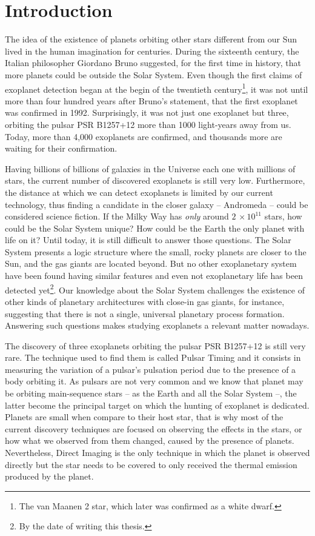 \chapter{Introduction}\label{chap:intro}
The idea of the existence of planets orbiting other stars different from our Sun lived in the human imagination for centuries. During the sixteenth century, the Italian philosopher Giordano Bruno suggested, for the first time in history, that more planets could be outside the Solar System. Even though the first claims of exoplanet detection began at the begin of the twentieth century\footnote{The van Maanen 2 star, which later was confirmed as a white dwarf.}, it was not until more than four hundred years after Bruno's statement, that the first exoplanet was confirmed in 1992. Surprisingly, it was not just one exoplanet but three, orbiting the pulsar PSR B1257+12 more than 1000 light-years away from us. Today, more than 4,000 exoplanets are confirmed, and thousands more are waiting for their confirmation.

Having billions of billions of galaxies in the Universe each one with millions of stars, the current number of discovered exoplanets is still very low. Furthermore, the distance at which we can detect exoplanets is limited by our current technology, thus finding a candidate in the closer galaxy -- Andromeda -- could be considered science fiction. If the Milky Way has \textit{only} around $2\,\times10^{11}$ stars, how could be the Solar System unique? How could be the Earth the only planet with life on it? Until today, it is still difficult to answer those questions. The Solar System presents a logic structure where the small, rocky planets are closer to the Sun, and the gas giants are located beyond. But no other exoplanetary system have been found having similar features and even not exoplanetary life has been detected yet\footnote{By the date of writing this thesis.}. Our knowledge about the Solar System challenges the existence of other kinds of planetary architectures with close-in gas giants, for instance, suggesting that there is not a single, universal planetary process formation. Answering such questions makes studying exoplanets a relevant matter nowadays.

The discovery of three exoplanets orbiting the pulsar PSR B1257+12 is still very rare. The technique used to find them is called Pulsar Timing and it consists in measuring the variation of a pulsar's pulsation period due to the presence of a body orbiting it. As pulsars are not very common and we know that planet may be orbiting main-sequence stars -- as the Earth and all the Solar System --, the latter become the principal target on which the hunting of exoplanet is dedicated. Planets are small when compare to their host star, that is why most of the current discovery techniques are focused on observing the effects in the stars, or how what we observed from them changed, caused by the presence of planets. Nevertheless, Direct Imaging is the only technique in which the planet is observed directly but the star needs to be covered to only received the thermal emission produced by the planet.  

